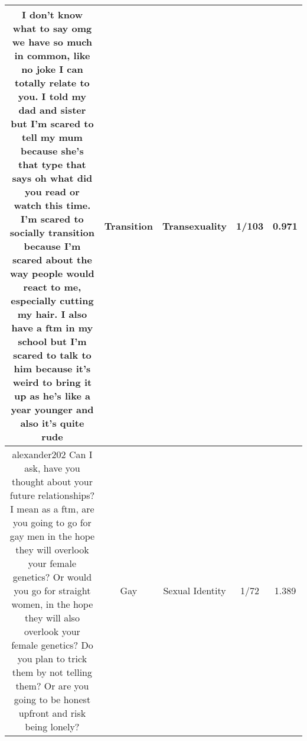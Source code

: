 \documentclass[11pt]{article}
\newlength\mylength
\begin{document}
\begin{center}
\begin{longtable}{|C{.40\mylength}|C{.30\mylength}|C{.15\mylength}|C{.15\mylength}|C{.15\mylength}|}
  I don't know what to say omg we have so much in common, like no joke I can totally relate to you. I told my dad and sister but I'm scared to tell my mum because she's that type that says oh what did you read or watch this time. I'm scared to socially transition because I'm scared about the way people would react to me, especially cutting my hair. I also have a ftm in my school but I'm scared to talk to him because it's weird to bring it up as he's like a year younger and also it's quite rude  & Transition & Transexuality & 1/103 & 0.971 \\  \hline
   alexander202 Can I ask, have you thought about your future relationships? I mean as a ftm, are you going to go for gay men in the hope they will overlook your female genetics? Or would you go for straight women, in the hope they will also overlook your female genetics? Do you plan to trick them by not telling them? Or are you going to be honest upfront and risk being lonely?  & Gay & Sexual Identity & 1/72 & 1.389 \\  \hline

\end{longtable}
\end{center}
\end{document}
